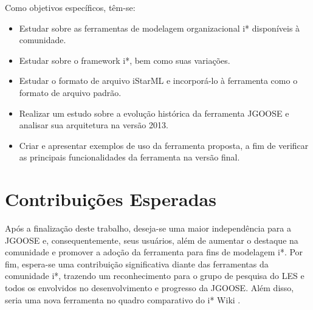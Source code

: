              Como objetivos específicos, têm-se:
            \begin{itemize}
                \item Estudar sobre as ferramentas de modelagem organizacional i* disponíveis à comunidade.
                \item Estudar sobre o framework i*, bem como suas variações.
                \item Estudar o formato de arquivo iStarML e incorporá-lo à ferramenta como o formato de arquivo padrão.
                \item Realizar um estudo sobre a evolução histórica da ferramenta JGOOSE e analisar sua arquitetura na versão 2013.
                \item Criar e apresentar exemplos de uso da ferramenta proposta, a fim de verificar as principais funcionalidades da ferramenta na versão final.
            \end{itemize}
    \section{Contribuições Esperadas}
        \label{cap:introducao:sec:contribuicoes}
        Após a finalização deste trabalho, deseja-se
            uma maior independência para a JGOOSE e, consequentemente, seus usuários,
            além de aumentar o destaque na comunidade e promover a adoção da ferramenta para fins de modelagem i*.
            Por fim, espera-se uma contribuição significativa diante das ferramentas da comunidade i*,
            trazendo um reconhecimento para o grupo de pesquisa do LES e todos os envolvidos no desenvolvimento e progresso da JGOOSE.
            Além disso, seria uma nova ferramenta no quadro comparativo do i* Wiki \cite{site2013iwiki}.

